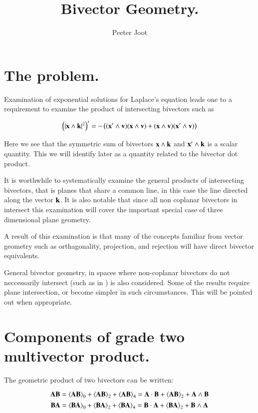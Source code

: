 \documentclass{article}      %
\title{Bivector Geometry.}
\author{Peeter Joot}         %
\newcommand{\gpgrade}[2] {{\left\langle{{#1}}\right\rangle}_{#2}}
\begin{document}

\maketitle{}

\section{ The problem. }

Examination of exponential solutions for Laplace's equation leads one to
a requirement to examine the product of intersecting bivectors such as

\[
\left(\lvert{\mathbf{x}\wedge \mathbf{k}}\rvert^2\right)' = -\left(
(\mathbf{x}' \wedge \mathbf{v})(\mathbf{x} \wedge \mathbf{v})
+(\mathbf{x} \wedge \mathbf{v})(\mathbf{x}' \wedge \mathbf{v})
\right)
\]

Here we see that the symmetric sum of bivectors $\mathbf{x} \wedge \mathbf{k}$ and $\mathbf{x}' \wedge \mathbf{k}$ is a scalar quantity.  This we will identify later as a quantity
related to the bivector dot product.

It is worthwhile to systematically examine the
general products of intersecting bivectors, that is planes that share a common line, in this case the line directed along the vector $\mathbf{k}$.
It is also notable that since all non coplanar bivectors in  intersect
this
examination will cover the important special case of three dimensional
plane geometry.

A result of this examination is that many of the concepts familiar from
vector geometry such as
orthagonality, projection, and rejection will have direct bivector
equivalents.

General bivector geometry, in spaces where non-coplanar bivectors do not 
neccessarily intersect (such as in ) is also considered.  Some of the
results require plane intersection, or become simpler in such circumstances.
This will be pointed out when appropriate.

\section{Components of grade two multivector product.}

The geometric product of two bivectors can be written:

\begin{equation}\label{eqn:ABprod}
\BA \BB = 
\gpgrade{\BA \BB}{0}
+\gpgrade{\BA \BB}{2}
+\gpgrade{\BA \BB}{4}
= 
{\BA \cdot \BB}
+\gpgrade{\BA \BB}{2}
+{\BA \wedge \BB}
\end{equation}
\begin{equation}\label{eqn:BAprod}
\BB \BA = 
\gpgrade{\BB \BA}{0}
+\gpgrade{\BB \BA}{2}
+\gpgrade{\BB \BA}{4}
= 
{\BB \cdot \BA}
+\gpgrade{\BB \BA}{2}
+{\BB \wedge \BA}
\end{equation}
\end{document}
